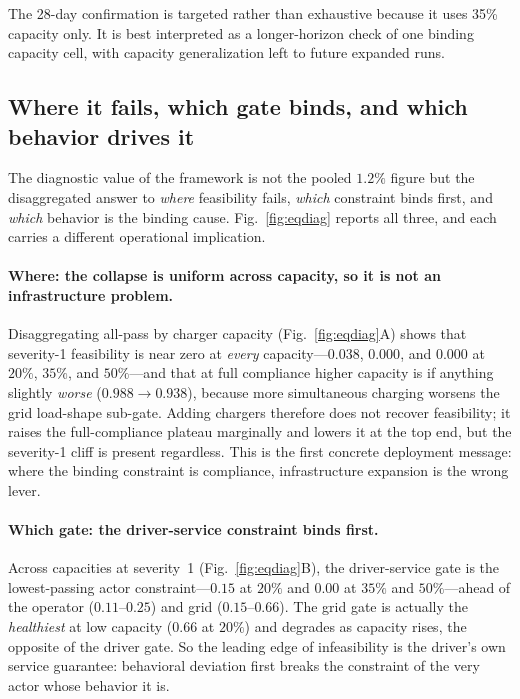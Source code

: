 \documentclass[12pt]{article}
\newcommand{\figref}[1]{Fig.~\ref{#1}}
\begin{document}
The 28-day confirmation is targeted rather than exhaustive because it uses 35\% capacity only. It is best interpreted as a longer-horizon check of one binding capacity cell, with capacity generalization left to future expanded runs.

\subsection{Where it fails, which gate binds, and which behavior drives it}\label{sec:diagnostic}

The diagnostic value of the framework is not the pooled $1.2\%$ figure but the disaggregated answer to \emph{where} feasibility fails, \emph{which} constraint binds first, and \emph{which} behavior is the binding cause. \figref{fig:eqdiag} reports all three, and each carries a different operational implication.

\paragraph{Where: the collapse is uniform across capacity, so it is not an infrastructure problem.} Disaggregating all-pass by charger capacity (\figref{fig:eqdiag}A) shows that severity-1 feasibility is near zero at \emph{every} capacity---$0.038$, $0.000$, and $0.000$ at $20\%$, $35\%$, and $50\%$---and that at full compliance higher capacity is if anything slightly \emph{worse} ($0.988\to0.938$), because more simultaneous charging worsens the grid load-shape sub-gate. Adding chargers therefore does not recover feasibility; it raises the full-compliance plateau marginally and lowers it at the top end, but the severity-1 cliff is present regardless. This is the first concrete deployment message: where the binding constraint is compliance, infrastructure expansion is the wrong lever.

\paragraph{Which gate: the driver-service constraint binds first.} Across capacities at severity~1 (\figref{fig:eqdiag}B), the driver-service gate is the lowest-passing actor constraint---$0.15$ at $20\%$ and $0.00$ at $35\%$ and $50\%$---ahead of the operator ($0.11$--$0.25$) and grid ($0.15$--$0.66$). The grid gate is actually the \emph{healthiest} at low capacity ($0.66$ at $20\%$) and degrades as capacity rises, the opposite of the driver gate. So the leading edge of infeasibility is the driver's own service guarantee: behavioral deviation first breaks the constraint of the very actor whose behavior it is.
\end{document}
